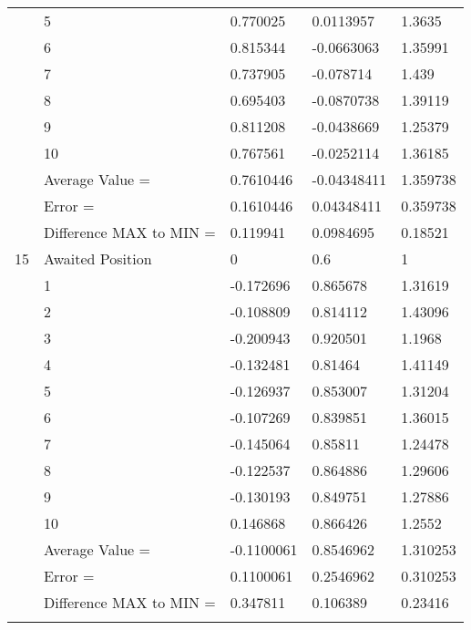 \begin{tabular}{|p{2cm}|p{3cm}|p{3cm}|p{3cm}|p{3cm}|}
             & 5                       & 0.770025     & 0.0113957    & 1.3635     \\
             & 6                       & 0.815344     & -0.0663063   & 1.35991    \\
             & 7                       & 0.737905     & -0.078714    & 1.439      \\
             & 8                       & 0.695403     & -0.0870738   & 1.39119    \\
             & 9                       & 0.811208     & -0.0438669   & 1.25379    \\
             & 10                      & 0.767561     & -0.0252114   & 1.36185    \\
             & Average Value =         & 0.7610446    & -0.04348411  & 1.359738   \\
             & Error =                 & 0.1610446    & 0.04348411   & 0.359738   \\
             & Difference MAX to MIN = & 0.119941     & 0.0984695    & 0.18521    \\
\hline
15           & Awaited Position        & 0            & 0.6          & 1          \\
             & 1                       & -0.172696    & 0.865678     & 1.31619    \\
             & 2                       & -0.108809    & 0.814112     & 1.43096    \\
             & 3                       & -0.200943    & 0.920501     & 1.1968     \\
             & 4                       & -0.132481    & 0.81464      & 1.41149    \\
             & 5                       & -0.126937    & 0.853007     & 1.31204    \\
             & 6                       & -0.107269    & 0.839851     & 1.36015    \\
             & 7                       & -0.145064    & 0.85811      & 1.24478    \\
             & 8                       & -0.122537    & 0.864886     & 1.29606    \\
             & 9                       & -0.130193    & 0.849751     & 1.27886    \\
             & 10                      & 0.146868     & 0.866426     & 1.2552     \\
             & Average Value =         & -0.1100061   & 0.8546962    & 1.310253   \\
             & Error =                 & 0.1100061    & 0.2546962    & 0.310253   \\
             & Difference MAX to MIN = & 0.347811     & 0.106389     & 0.23416    \\
             &                         &              &              &           
\end{tabular}